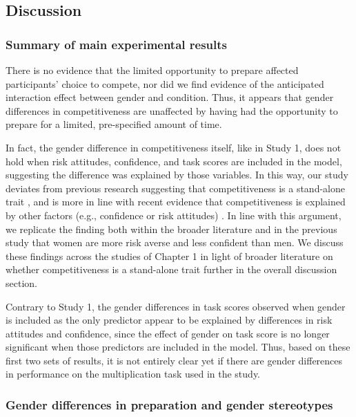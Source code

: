 \documentclass[a4paper, nobind]{templates/ociamthesis}
\begin{document}
\hypertarget{discussion-1}{%
\subsection{Discussion}\label{discussion-1}}

\hypertarget{summary-of-main-experimental-results-1}{%
\subsubsection{Summary of main experimental results}\label{summary-of-main-experimental-results-1}}

There is no evidence that the limited opportunity to prepare affected participants' choice to compete, nor did we find evidence of the anticipated interaction effect between gender and condition. Thus, it appears that gender differences in competitiveness are unaffected by having had the opportunity to prepare for a limited, pre-specified amount of time.

In fact, the gender difference in competitiveness itself, like in Study 1, does not hold when risk attitudes, confidence, and task scores are included in the model, suggesting the difference was explained by those variables. In this way, our study deviates from previous research suggesting that competitiveness is a stand-alone trait \autocite{Niederle2007}, and is more in line with recent evidence that competitiveness is explained by other factors (e.g., confidence or risk attitudes) \autocite{Gillen2019,Veldhuizen2017}. In line with this argument, we replicate the finding both within the broader literature and in the previous study that women are more risk averse and less confident than men. We discuss these findings across the studies of Chapter 1 in light of broader literature on whether competitiveness is a stand-alone trait further in the overall discussion section.

Contrary to Study 1, the gender differences in task scores observed when gender is included as the only predictor appear to be explained by differences in risk attitudes and confidence, since the effect of gender on task score is no longer significant when those predictors are included in the model. Thus, based on these first two sets of results, it is not entirely clear yet if there are gender differences in performance on the multiplication task used in the study.

\hypertarget{gender-differences-in-preparation-and-gender-stereotypes}{%
\subsubsection{Gender differences in preparation and gender stereotypes}\label{gender-differences-in-preparation-and-gender-stereotypes}}
\end{document}
